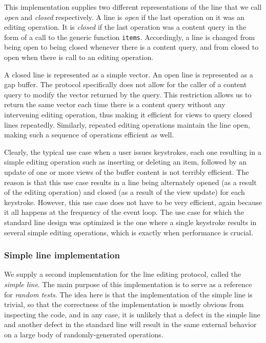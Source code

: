 This implementation supplies two different representations of the line
that we call \emph{open} and \emph{closed} respectively.  A line is
\emph{open} if the last operation on it was an editing operation.  It
is \emph{closed} if the last operation was a content query in the
form of a call to the generic function \texttt{items}.  Accordingly, a
line is changed from being open to being closed whenever there is a
content query, and from closed to open when there is call to an
editing operation.

A closed line is represented as a \commonlisp{} simple vector.  An
open line is represented as a gap buffer. 
The protocol specifically does not allow for the caller of a content
query to modify the vector returned by the query.  This restriction
allows us to return the same vector each time there is a content
query without any intervening editing operation, thus making it
efficient for views to query closed lines repeatedly.  Similarly,
repeated editing operations maintain the line open, making such a
sequence of operations efficient as well.

Clearly, the typical use case when a user issues keystrokes, each one
resulting in a simple editing operation such as inserting or deleting
an item, followed by an update of one or more views of the buffer
content is not terribly efficient.  The reason is that this use case
results in a line being alternately opened (as a result of the editing
operation) and closed (as a result of the view update) for each
keystroke.  However, this use case does not have to be very efficient,
again because it all happens at the frequency of the event loop.  The
use case for which the standard line design was optimized is the one
where a single keystroke results in several simple editing operations,
which is exactly when performance is crucial.

\subsubsection{Simple line implementation}

We supply a second implementation for the line editing protocol,
called the \emph{simple line}.  The main purpose of this
implementation is to serve as a reference for \emph{random tests}.
The idea here is that the implementation of the simple line is
trivial, so that the correctness of the implementation is mostly
obvious from inspecting the code, and in any case, it is unlikely that
a defect in the simple line and another defect in the standard
line will result in the same external behavior on a large body of
randomly-generated operations.


